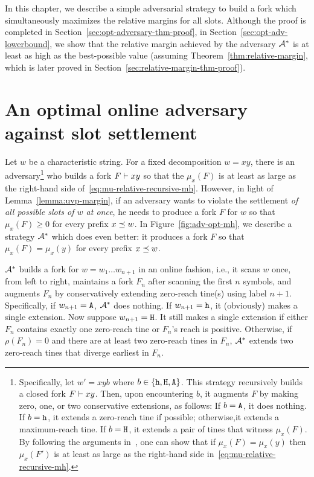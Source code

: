 

In this chapter, 
we describe a simple adversarial strategy to build a fork 
which simultaneously maximizes the relative margins for all slots. 
Although the proof is completed in Section~\ref{sec:opt-adversary-thm-proof}, 
in Section~\ref{sec:opt-adv-lowerbound}, 
we show that the relative margin achieved by the adversary $\mathcal{A}^*$ 
is at least as high as the best-possible value 
(assuming Theorem~\ref{thm:relative-margin}, which is later proved in Section~\ref{sec:relative-margin-thm-proof}).

\section{An optimal online adversary against slot settlement}
\label{sec:opt-adversary}
Let $w$ be a characteristic string. 
For a fixed decomposition $w = xy$, 
there is an adversary\footnote{
  Specifically, 
  let $w' = xyb$ 
  where $b \in \{\mathtt{h}, \mathtt{H}, \mathtt{A}\}$. 
  This strategy recursively builds a closed fork $F \vdash xy$. 
  Then, upon encountering $b$, 
  it augments $F$ 
  by making zero, one, or two conservative extensions, as follows: 
  If $b = \mathtt{A}$, it does nothing. 
  If $b = \mathtt{h}$, it extends a zero-reach tine if possible; 
  otherwise,it extends a maximum-reach tine. 
  If $b = \mathtt{H}$, it extends a pair of tines that 
  witness $\mu_x(F)$. 
  By following the arguments in~\cite{LinearConsistencySODA}, 
  one can show that 
  if $\mu_x(F) = \mu_x(y)$ then 
  $\mu_x(F')$ is 
  at least as large as 
  the right-hand side in~\eqref{eq:mu-relative-recursive-mh}.   
} 
who builds a fork $F \vdash xy$ 
so that the $\mu_x(F)$ is 
at least as large as 
the right-hand side of~\eqref{eq:mu-relative-recursive-mh}. 
However, 
in light of Lemma~\ref{lemma:uvp-margin}, 
if an adversary wants to violate the settlement 
\emph{of all possible slots of $w$ at once}, 
he needs to produce a fork $F$ for $w$ 
so that $\mu_x(F) \geq 0$ 
for every prefix $x \preceq w$. 
In Figure~\ref{fig:adv-opt-mh}, 
we describe a strategy $\mathcal{A}^*$ 
which does even better: 
it produces a fork $F$ so that $\mu_x(F) = \mu_x(y)$ 
for every prefix $x \preceq w$. 


$\mathcal{A}^*$ builds a fork for $w = w_1 \ldots w_{n+1}$ 
in an online fashion, i.e., 
it scans $w$ once, from left to right, 
maintains a fork $F_n$ after scanning 
the first $n$ symbols, 
and augments $F_n$ by conservatively extending 
zero-reach tine(s) using label $n + 1$.
Specifically, if $w_{n+1} = \mathtt{A}$, $\mathcal{A}^*$ does nothing. 
If $w_{n+1} = \mathtt{h}$, it (obviously) makes a single extension. 
Now suppose $w_{n+1} = \mathtt{H}$. 
It still makes a single extension
if either $F_n$ contains exactly one zero-reach tine 
or $F_n$'s reach is positive. 
Otherwise, 
if $\rho(F_n) = 0$ 
and there are at least two zero-reach tines in $F_n$, 
$\mathcal{A}^*$ extends two zero-reach tines 
that diverge earliest in $F_n$.



